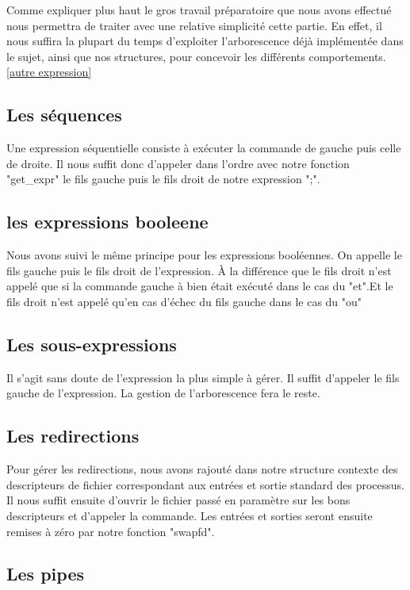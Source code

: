 \documentclass[12pt]{article}
\begin{document}
Comme expliquer plus haut le gros travail préparatoire que nous avons effectué nous permettra
de traiter avec une relative simplicité cette partie. En effet, il nous suffira la plupart du temps 
d'exploiter l'arborescence déjà implémentée dans le sujet, ainsi que nos structures, pour concevoir
les différents comportements.\ref{autre expression}

\subsection{Les séquences}

Une expression séquentielle consiste à exécuter la commande de gauche puis celle de droite.
Il nous suffit donc d'appeler dans l'ordre avec notre fonction "get\_expr" le fils gauche puis le fils
droit de notre expression ";".

\subsection{les expressions booleene}

Nous avons suivi le même principe pour les expressions booléennes. On appelle le fils gauche puis
le fils droit de l'expression.
À la différence que le fils droit n'est appelé que si la commande gauche à bien était exécuté dans le
cas du "et".Et le fils droit n'est appelé qu’en cas d'échec du fils gauche dans le cas du "ou"

\subsection{Les sous-expressions}

Il s'agit sans doute de l'expression la plus simple à gérer. Il suffit d'appeler le fils
gauche de l'expression. La gestion de l'arborescence fera le reste.

\subsection{Les redirections}

Pour gérer les redirections, nous avons rajouté dans notre structure contexte des descripteurs
de fichier correspondant aux entrées et sortie standard des processus. Il nous suffit ensuite 
d'ouvrir le fichier passé en paramètre sur les bons descripteurs et d'appeler la commande.
Les entrées et sorties seront ensuite remises à zéro par notre fonction "swapfd".

\subsection{Les pipes}
\end{document}
